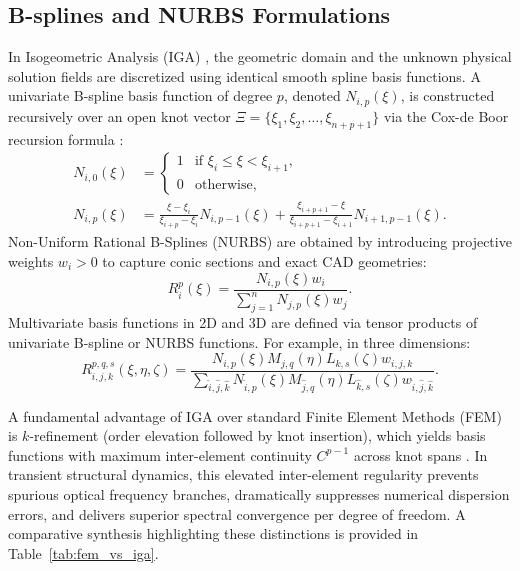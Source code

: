 \subsection{B-splines and NURBS Formulations}
\label{subsec:bsplines_nurbs}
In Isogeometric Analysis (IGA) \cite{hughes2005, cottrell2009}, the geometric domain and the unknown physical solution fields are discretized using identical smooth spline basis functions. A univariate B-spline basis function of degree $p$, denoted $N_{i,p}(\xi)$, is constructed recursively over an open knot vector $\Xi = \{\xi_1, \xi_2, \dots, \xi_{n+p+1}\}$ via the Cox-de Boor recursion formula \cite{piegl1997}:
\begin{align}
    N_{i,0}(\xi) &= \begin{cases} 1 & \text{if } \xi_i \le \xi < \xi_{i+1}, \\ 0 & \text{otherwise}, \end{cases} \\
    N_{i,p}(\xi) &= \frac{\xi - \xi_i}{\xi_{i+p} - \xi_i} N_{i,p-1}(\xi) + \frac{\xi_{i+p+1} - \xi}{\xi_{i+p+1} - \xi_{i+1}} N_{i+1,p-1}(\xi).
\end{align}
Non-Uniform Rational B-Splines (NURBS) are obtained by introducing projective weights $w_i > 0$ to capture conic sections and exact CAD geometries:
\begin{equation}
    R_i^p(\xi) = \frac{N_{i,p}(\xi) w_i}{\sum_{j=1}^n N_{j,p}(\xi) w_j}.
\end{equation}
Multivariate basis functions in 2D and 3D are defined via tensor products of univariate B-spline or NURBS functions. For example, in three dimensions:
\begin{equation}
    R_{i,j,k}^{p,q,s}(\xi, \eta, \zeta) = \frac{N_{i,p}(\xi) M_{j,q}(\eta) L_{k,s}(\zeta) w_{i,j,k}}{\sum_{\hat{i},\hat{j},\hat{k}} N_{\hat{i},p}(\xi) M_{\hat{j},q}(\eta) L_{\hat{k},s}(\zeta) w_{\hat{i},\hat{j},\hat{k}}}.
\end{equation}

A fundamental advantage of IGA over standard Finite Element Methods (FEM) is $k$-refinement (order elevation followed by knot insertion), which yields basis functions with maximum inter-element continuity $C^{p-1}$ across knot spans \cite{cottrell2009}. In transient structural dynamics, this elevated inter-element regularity prevents spurious optical frequency branches, dramatically suppresses numerical dispersion errors, and delivers superior spectral convergence per degree of freedom. A comparative synthesis highlighting these distinctions is provided in Table~\ref{tab:fem_vs_iga}.

